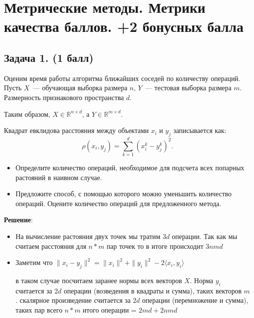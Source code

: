 \documentclass{article}
\begin{document}
\section*{Метрические методы. Метрики качества  баллов. +2 бонусных балла}

\subsection*{Задача 1. (1 балл)}

    Оценим время работы алгоритма ближайших соседей по количеству операций. Пусть $X$~--- обучающая выборка размера $n$, $Y$~--- тестовая выборка размера $m$. Размерность признакового пространства $d$. 
    
    \noindent
    Таким образом, $X \in \mathbb{R}^{n \times d}$, а $Y \in \mathbb{R}^{m \times d}$.
    
    \noindent
    Квадрат евклидова расстояния между объектами $x_i$ и $y_j$ записывается как:
    $$
        \rho(x_i, y_j) = \sum_{k=1}^d (x_i^k - y_j^k)^2.        
    $$
    \begin{itemize}
        \item Определите количество операций, необходимое для подсчета всех попарных растояний в наивном случае.
        
        \item Предложите способ, с помощью которого можно уменьшить количество операций. Оцените количество операций для предложенного метода.
    \end{itemize}

\noindent
\textbf{Решение}:

    \begin{itemize}
        \item На вычисление растояния двух точек мы тратим $3d$ операции. Так как мы считаем расстояния для $n * m$ пар точек то в итоге происходит $3nmd$
        
        \item Заметим что $\| x_i - y_j\|^2 = \|x_i\|^2 + \|y_i \|^2 -2 \langle x_i, y_i \rangle $
        
        в таком случае посчитаем заранее нормы всех векторов $X$. Норма $y_i$ считается за $2d$ операции (возведения в квадраты и сумма), таких векторов $m$. скалярное произведение считается за $2d$ операции (перемножение и сумма), таких пар всего $n*m$
        итого операции = $2md + 2nmd$
        
    \end{itemize}
\end{document}
